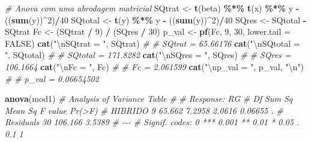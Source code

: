\documentclass[
]{book}
\newenvironment{Shaded}{\begin{snugshade}}{\end{snugshade}}
\newcommand{\CharTok}[1]{\textcolor[rgb]{0.31,0.60,0.02}{#1}}
\newcommand{\CommentTok}[1]{\textcolor[rgb]{0.56,0.35,0.01}{\textit{#1}}}
\newcommand{\DataTypeTok}[1]{\textcolor[rgb]{0.13,0.29,0.53}{#1}}
\newcommand{\DecValTok}[1]{\textcolor[rgb]{0.00,0.00,0.81}{#1}}
\newcommand{\KeywordTok}[1]{\textcolor[rgb]{0.13,0.29,0.53}{\textbf{#1}}}
\newcommand{\NormalTok}[1]{#1}
\newcommand{\OperatorTok}[1]{\textcolor[rgb]{0.81,0.36,0.00}{\textbf{#1}}}
\newcommand{\OtherTok}[1]{\textcolor[rgb]{0.56,0.35,0.01}{#1}}
\newcommand{\StringTok}[1]{\textcolor[rgb]{0.31,0.60,0.02}{#1}}
\numberwithin{equation}{section}
\begin{document}
\begin{Shaded}
\begin{Highlighting}[]
\CommentTok{\# Anova com uma abrodagem matricial}
\NormalTok{SQtrat \textless{}{-}}\StringTok{ }\KeywordTok{t}\NormalTok{(beta) }\OperatorTok{\%*\%}\StringTok{ }\KeywordTok{t}\NormalTok{(x) }\OperatorTok{\%*\%}\StringTok{ }\NormalTok{y }\OperatorTok{{-}}\StringTok{ }\NormalTok{((}\KeywordTok{sum}\NormalTok{(y))}\OperatorTok{\^{}}\DecValTok{2}\NormalTok{)}\OperatorTok{/}\DecValTok{40}
\NormalTok{SQtotal \textless{}{-}}\StringTok{ }\KeywordTok{t}\NormalTok{(y) }\OperatorTok{\%*\%}\StringTok{ }\NormalTok{y }\OperatorTok{{-}}\StringTok{ }\NormalTok{((}\KeywordTok{sum}\NormalTok{(y))}\OperatorTok{\^{}}\DecValTok{2}\NormalTok{)}\OperatorTok{/}\DecValTok{40}
\NormalTok{SQres \textless{}{-}}\StringTok{ }\NormalTok{SQtotal }\OperatorTok{{-}}\StringTok{ }\NormalTok{SQtrat}
\NormalTok{Fc \textless{}{-}}\StringTok{ }\NormalTok{(SQtrat }\OperatorTok{/}\StringTok{ }\DecValTok{9}\NormalTok{) }\OperatorTok{/}\StringTok{ }\NormalTok{(SQres }\OperatorTok{/}\StringTok{ }\DecValTok{30}\NormalTok{)}
\NormalTok{p\_val \textless{}{-}}\StringTok{ }\KeywordTok{pf}\NormalTok{(Fc, }\DecValTok{9}\NormalTok{, }\DecValTok{30}\NormalTok{, }\DataTypeTok{lower.tail =} \OtherTok{FALSE}\NormalTok{)}
\KeywordTok{cat}\NormalTok{(}\StringTok{"}\CharTok{\textbackslash{}n}\StringTok{SQtrat = "}\NormalTok{, SQtrat)}
\CommentTok{\# }
\CommentTok{\# SQtrat =  65.66176}
\KeywordTok{cat}\NormalTok{(}\StringTok{"}\CharTok{\textbackslash{}n}\StringTok{SQtotal = "}\NormalTok{, SQtotal)}
\CommentTok{\# }
\CommentTok{\# SQtotal =  171.8282}
\KeywordTok{cat}\NormalTok{(}\StringTok{"}\CharTok{\textbackslash{}n}\StringTok{SQres = "}\NormalTok{, SQres)}
\CommentTok{\# }
\CommentTok{\# SQres =  106.1664}
\KeywordTok{cat}\NormalTok{(}\StringTok{"}\CharTok{\textbackslash{}n}\StringTok{Fc = "}\NormalTok{, Fc)}
\CommentTok{\# }
\CommentTok{\# Fc =  2.061599}
\KeywordTok{cat}\NormalTok{(}\StringTok{"}\CharTok{\textbackslash{}n}\StringTok{p\_val = "}\NormalTok{, p\_val, }\StringTok{"}\CharTok{\textbackslash{}n}\StringTok{"}\NormalTok{)}
\CommentTok{\# }
\CommentTok{\# p\_val =  0.06654502}

\KeywordTok{anova}\NormalTok{(mod1)}
\CommentTok{\# Analysis of Variance Table}
\CommentTok{\# }
\CommentTok{\# Response: RG}
\CommentTok{\#           Df  Sum Sq Mean Sq F value  Pr(\textgreater{}F)  }
\CommentTok{\# HIBRIDO    9  65.662  7.2958  2.0616 0.06655 .}
\CommentTok{\# Residuals 30 106.166  3.5389                  }
\CommentTok{\# {-}{-}{-}}
\CommentTok{\# Signif. codes:  0 \textquotesingle{}***\textquotesingle{} 0.001 \textquotesingle{}**\textquotesingle{} 0.01 \textquotesingle{}*\textquotesingle{} 0.05 \textquotesingle{}.\textquotesingle{} 0.1 \textquotesingle{} \textquotesingle{} 1}
\end{Highlighting}
\end{Shaded}
\end{document}
